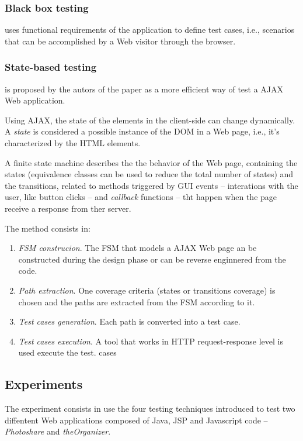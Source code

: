 \documentclass[a4paper]{article}
\begin{document}
\subsubsection{Black box testing} 

uses functional requirements of the application to define test cases, i.e., scenarios that can be accomplished by a Web visitor through the browser.

\subsubsection{State-based testing}

is proposed by the autors of the paper as a more efficient way of test a AJAX Web application.

Using AJAX, the state of the elements in the client-side can change dynamically.
A \emph{state} is considered a possible instance of the DOM in a Web page, i.e., it's characterized by the HTML elements.

A finite state machine describes the the behavior of the Web page, containing the states (equivalence classes can be used to reduce the total number of states) and the transitions, related to methods triggered by GUI events -- interations with the user, like button clicks -- and \emph{callback} functions -- tht happen when the page receive a response from ther server.

The method consists in: 

\begin{enumerate}
\item \emph{FSM construcion}. The FSM that models a AJAX Web page an be constructed during the design phase or can be reverse enginnered from the code.
\item \emph{Path extraction}. One coverage criteria (states or transitions coverage) is chosen and the paths are extracted from the FSM according to it.
\item \emph{Test cases generation}. Each path is converted into a test case.
\item \emph{Test cases execution}. A tool that works in HTTP request-response level is used execute the test. cases
\end{enumerate}

\subsection{Experiments}

The experiment consists in use the four testing techniques introduced to test two diffentent Web applications composed of Java, JSP and Javascript code -- \emph{Photoshare} and \emph{theOrganizer}.
\end{document}

